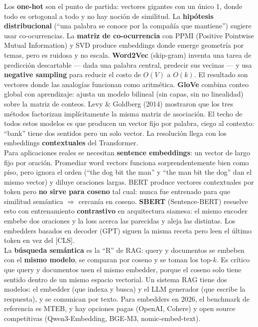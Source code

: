 \documentclass[11pt,a4paper]{article}
\begin{document}
Los \textbf{one-hot} son el punto de partida: vectores gigantes con un \'unico 1, donde todo es ortogonal a todo y no hay noci\'on de similitud. La \textbf{hip\'otesis distribucional} (``una palabra se conoce por la compa\~n\'ia que mantiene'') sugiere usar co-ocurrencias. La \textbf{matriz de co-ocurrencia} con PPMI (Positive Pointwise Mutual Information) y SVD produce embeddings donde emerge geometr\'ia por temas, pero es ruidosa y no escala. \textbf{Word2Vec} (skip-gram) inventa una tarea de predicci\'on descartable --- dada una palabra central, predecir sus vecinas --- y usa \textbf{negative sampling} para reducir el costo de $O(V)$ a $O(k)$. El resultado son vectores donde las analog\'ias funcionan como aritm\'etica. \textbf{GloVe} combina conteo global con aprendizaje: ajusta un modelo bilineal (sin capas, sin no linealidad) sobre la matriz de conteos. Levy \& Goldberg (2014) mostraron que los tres m\'etodos factorizan impl\'icitamente la misma matriz de asociaci\'on. El techo de todos estos modelos es que producen un vector fijo por palabra, ciego al contexto: ``bank'' tiene dos sentidos pero un solo vector. La resoluci\'on llega con los embeddings \textbf{contextuales} del Transformer. \\[1ex]

Para aplicaciones reales se necesitan \textbf{sentence embeddings}: un vector de largo fijo por oraci\'on. Promediar word vectors funciona sorprendentemente bien como piso, pero ignora el orden (``the dog bit the man'' y ``the man bit the dog'' dan el mismo vector) y diluye oraciones largas. BERT produce vectores contextuales por token pero \textbf{no sirve para coseno} tal cual: nunca fue entrenado para que similitud sem\'antica $\Rightarrow$ cercan\'ia en coseno. \textbf{SBERT} (Sentence-BERT) resuelve esto con entrenamiento \textbf{contrastivo} en arquitectura siamesa: el mismo encoder embebe dos oraciones y la loss acerca las parecidas y aleja las distintas. Los embedders basados en decoder (GPT) siguen la misma receta pero leen el \'ultimo token en vez del [CLS]. \\[1ex]

La \textbf{b\'usqueda sem\'antica} es la ``R'' de RAG: query y documentos se embeben con el \textbf{mismo modelo}, se comparan por coseno y se toman los top-$k$. Es cr\'itico que query y documentos usen el mismo embedder, porque el coseno solo tiene sentido dentro de un mismo espacio vectorial. Un sistema RAG tiene dos modelos: el embedder (que indexa y busca) y el LLM generador (que escribe la respuesta), y se comunican por texto. Para embedders en 2026, el benchmark de referencia es MTEB, y hay opciones pagas (OpenAI, Cohere) y open source competitivas (Qwen3-Embedding, BGE-M3, nomic-embed-text). \\[1ex]
\end{document}
